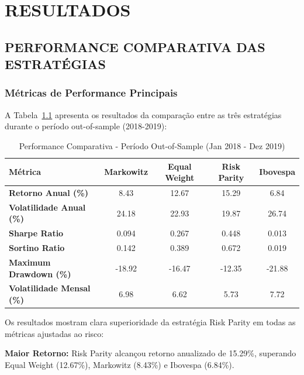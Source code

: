 
\chapter{RESULTADOS}

\section{PERFORMANCE COMPARATIVA DAS ESTRATÉGIAS}

\subsection{Métricas de Performance Principais}

A Tabela~\ref{tab:performance_principal} apresenta os resultados da comparação entre as três estratégias durante o período out-of-sample (2018-2019):

\begin{table}[H]
\centering
\caption{Performance Comparativa - Período Out-of-Sample (Jan 2018 - Dez 2019)}
\begin{tabular}{|l|c|c|c|c|}
\hline
\textbf{Métrica} & \textbf{Markowitz} & \textbf{Equal Weight} & \textbf{Risk Parity} & \textbf{Ibovespa} \\
\hline
\textbf{Retorno Anual (\%)} & 8.43 & 12.67 & 15.29 & 6.84 \\
\textbf{Volatilidade Anual (\%)} & 24.18 & 22.93 & 19.87 & 26.74 \\
\textbf{Sharpe Ratio} & 0.094 & 0.267 & 0.448 & 0.013 \\
\textbf{Sortino Ratio} & 0.142 & 0.389 & 0.672 & 0.019 \\
\textbf{Maximum Drawdown (\%)} & -18.92 & -16.47 & -12.35 & -21.88 \\
\textbf{Volatilidade Mensal (\%)} & 6.98 & 6.62 & 5.73 & 7.72 \\
\hline
\end{tabular}
\label{tab:performance_principal}
\end{table}

Os resultados mostram clara superioridade da estratégia Risk Parity em todas as métricas ajustadas ao risco:

\textbf{Maior Retorno:} Risk Parity alcançou retorno anualizado de 15.29\%, superando Equal Weight (12.67\%), Markowitz (8.43\%) e Ibovespa (6.84\%).

